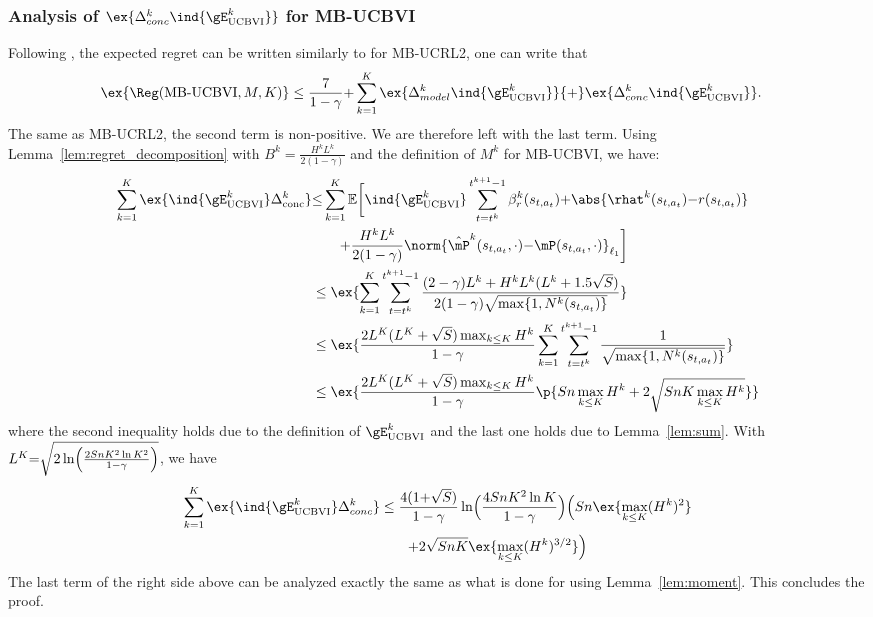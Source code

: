 \begin{subappendices}
\subsubsection{Analysis of $\ex{\Delta_{conc}^k\ind{\gE_\text{UCBVI}^{k}}}$ for MB-UCBVI}
Following , the expected regret can be written similarly to  for MB-UCRL2, one can write that
\begin{align*}
    \ex{\Reg(\text{MB-UCBVI},M,K)}
    &\le \frac{7}{1-\gamma} {+} \sum_{k=1}^{K} \ex{\Delta_{model}^k\ind{\gE_\text{UCBVI}^{k}}} {+} \ex{\Delta_{conc}^k\ind{\gE_\text{UCBVI}^{k}}}.
\end{align*}
The same as MB-UCRL2, the second term is non-positive.
We are therefore left with the last term.
Using Lemma~\ref{lem:regret_decomposition} with $B^k=\frac{H^kL^{k}}{2(1-\gamma)}$ and the definition of $M^k$ for MB-UCBVI, we have:
\begin{align*}
    \sum_{k=1}^K \ex{ \ind{\gE^{k}_\text{UCBVI}} \Delta^k_\text{conc}}
    &{\le} \sum_{k=1}^K \mathbb{E}\bigg[ \ind{\gE^{k}_\text{UCBVI}}\sum_{t=t^k}^{t^{k+1}-1} \beta^{k}_r(s_{t,a_t}){+}\abs{\rhat^{k}(s_{t,a_t}){-}r(s_{t,a_t})} \\
    &\qquad {+}\frac{H^kL^{k}}{2(1-\gamma)}\norm{\hat{\mP}^{k}(s_{t,a_t},\cdot){-}\mP(s_{t,a_t},\cdot)}_{\ell_1} \bigg] \\
    &\le \ex{\sum_{k=1}^{K}\sum_{t=t^k}^{t^{k+1}-1} \frac{(2-\gamma)L^{k}+H^kL^{k}(L^{k}+1.5\sqrt{S})}{2(1-\gamma)\sqrt{\max\{1,N^{k}(s_{t,a_t})\} }}} \\
    &\le \ex{\frac{2L^K(L^K+\sqrt{S})\max_{k\le K}H^k}{1-\gamma} \sum_{k=1}^{K} \sum_{t=t^k}^{t^{k+1}-1} \frac1{\sqrt{\max\{1,N^{k}(s_{t,a_t})\} }}} \\
    &\le \ex{\frac{2L^K(L^K+\sqrt{S})\max_{k\le K}H^k}{1-\gamma} \p{Sn\max_{k\le K}H^k +2\sqrt{SnK\max_{k\le K}H^k} }} 
\end{align*}
where the second inequality holds due to the definition of $\gE^{k}_\text{UCBVI}$ and the last one holds due to Lemma~\ref{lem:sum}.
With $L^K{=}\sqrt{2\ln\Bigl(\frac{2SnK^2\ln K^2}{1-\gamma}\Bigr)}$, we have
\begin{align*}
    \sum_{k=1}^K \ex{ \ind{\gE^{k}_\text{UCBVI}} \Delta^k_{conc}}
    &\le \frac{4(1{+}\sqrt{S})}{1-\gamma} \ln \Bigl(\frac{4SnK^2\ln K}{1-\gamma}\Bigr) \Bigl(Sn\ex{\max_{k\le K}(H^k)^2} \\
    &\qquad {+}2\sqrt{SnK} \ex{\max_{k\le K}(H^k)^{3/2}}\Bigr)
\end{align*}
The last term of the right side above can be analyzed exactly the same as what is done for  using Lemma~\ref{lem:moment}.
This concludes the proof.


\end{subappendices}
